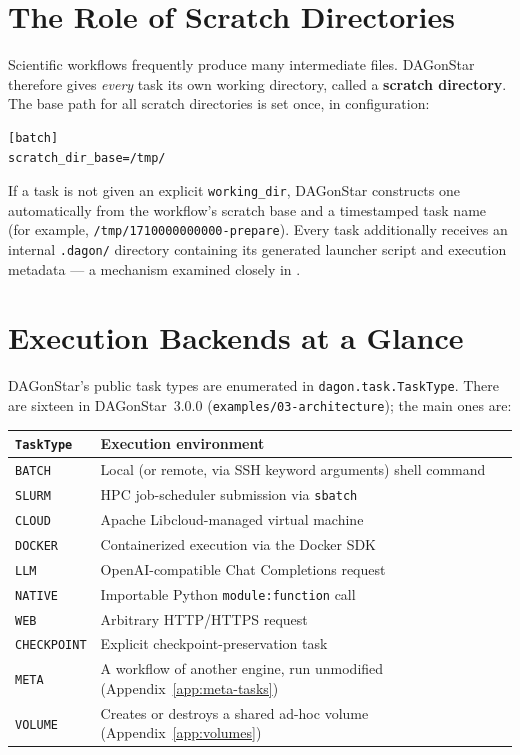 \section{The Role of Scratch Directories}

Scientific workflows frequently produce many intermediate files. DAGonStar
therefore gives \emph{every} task its own working directory, called a
\textbf{scratch directory}. The base path for all scratch directories is set
once, in configuration:

\begin{lstlisting}[style=ini,caption={Minimal scratch directory configuration.}]
[batch]
scratch_dir_base=/tmp/
\end{lstlisting}

If a task is not given an explicit \texttt{working\_dir}, DAGonStar
constructs one automatically from the workflow's scratch base and a
timestamped task name (for example, \texttt{/tmp/1710000000000-prepare}).
Every task additionally receives an internal \texttt{.dagon/} directory
containing its generated launcher script and execution metadata --- a
mechanism examined closely in .

\section{Execution Backends at a Glance}

DAGonStar's public task types are enumerated in \texttt{dagon.task.TaskType}.
There are sixteen in DAGonStar~3.0.0 (\texttt{examples/03-architecture}); the
main ones are:

\begin{center}
\begin{tabular}{@{}ll@{}}
\toprule
\textbf{\texttt{TaskType}} & \textbf{Execution environment} \\
\midrule
\texttt{BATCH}      & Local (or remote, via SSH keyword arguments) shell command \\
\texttt{SLURM}       & HPC job-scheduler submission via \texttt{sbatch} \\
\texttt{CLOUD}       & Apache Libcloud-managed virtual machine \\
\texttt{DOCKER}      & Containerized execution via the Docker SDK \\
\texttt{LLM}         & OpenAI-compatible Chat Completions request \\
\texttt{NATIVE}      & Importable Python \texttt{module:function} call \\
\texttt{WEB}         & Arbitrary HTTP/HTTPS request \\
\texttt{CHECKPOINT}  & Explicit checkpoint-preservation task \\
\texttt{META}        & A workflow of another engine, run unmodified (Appendix~\ref{app:meta-tasks}) \\
\texttt{VOLUME}      & Creates or destroys a shared ad-hoc volume (Appendix~\ref{app:volumes}) \\
\bottomrule
\end{tabular}
\end{center}

